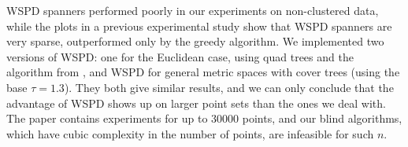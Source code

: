 \documentclass[]{ws-ijcga}
\newcommand{\ignore}[1]{}
\begin{document}
WSPD spanners performed poorly in our experiments
on non-clustered data, while the plots in a previous experimental study \cite{farshi2009experimental}
show that WSPD spanners are very sparse, outperformed only by the greedy algorithm.
We implemented two versions of  WSPD: one for the Euclidean case,
using quad trees and the algorithm from \cite{hp-book}, and WSPD for general metric
spaces with cover trees (using the base $\tau=1.3$). 
They both give similar results, and we can only conclude
that the advantage of WSPD shows up on larger point sets than the ones we deal with.
The paper \cite{farshi2009experimental} contains experiments for up to 30000 points,
and our blind algorithms, which have cubic complexity in the number of points,
are infeasible for such $n$.



\end{document}
